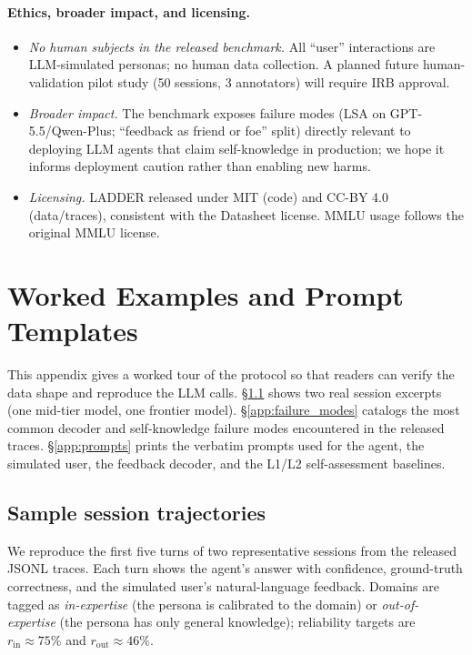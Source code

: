 \documentclass[11pt]{article}
\begin{document}
\paragraph{Ethics, broader impact, and licensing.}
\begin{itemize}[nosep,leftmargin=1.4em]
  \item \emph{No human subjects in the released benchmark.} All ``user'' interactions are LLM-simulated personas; no human data collection. A planned future human-validation pilot study (50 sessions, 3 annotators) will require IRB approval.
  \item \emph{Broader impact.} The benchmark exposes failure modes (LSA on GPT-5.5/Qwen-Plus; ``feedback as friend or foe'' split) directly relevant to deploying LLM agents that claim self-knowledge in production; we hope it informs deployment caution rather than enabling new harms.
  \item \emph{Licensing.} LADDER released under MIT (code) and CC-BY 4.0 (data/traces), consistent with the Datasheet license. MMLU usage follows the original MMLU license.
\end{itemize}


\section{Worked Examples and Prompt Templates}
\label{app:group_i}

This appendix gives a worked tour of the protocol so that readers can verify the data shape and reproduce the LLM calls. \S\ref{app:sample_sessions} shows two real session excerpts (one mid-tier model, one frontier model). \S\ref{app:failure_modes} catalogs the most common decoder and self-knowledge failure modes encountered in the released traces. \S\ref{app:prompts} prints the verbatim prompts used for the agent, the simulated user, the feedback decoder, and the L1/L2 self-assessment baselines.

\subsection{Sample session trajectories}
\label{app:sample_sessions}

We reproduce the first five turns of two representative sessions from the released JSONL traces. Each turn shows the agent's answer with confidence, ground-truth correctness, and the simulated user's natural-language feedback. Domains are tagged as \textit{in-expertise} (the persona is calibrated to the domain) or \textit{out-of-expertise} (the persona has only general knowledge); reliability targets are $r_{\text{in}}\!\approx\!75\%$ and $r_{\text{out}}\!\approx\!46\%$.
\end{document}
